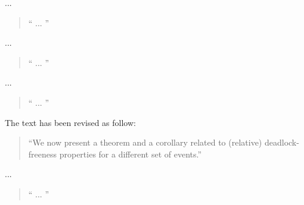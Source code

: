 \documentclass{response}
\begin{document}
\begin{comment}{Reviewer \#1}
• p.15 Fig. 5 is too small. One cannot read its text.
\end{comment}

\begin{response}
  ...
  \begin{quote}
    `` ...
   ''
  \end{quote}
\end{response}

\begin{comment}{Reviewer \#1}
• p.18 It would have been interesting to state the discussion of the first
paragraph of section 7: Verification of Safety Properties within the
context of the proof obligation generator you have at hand.
\end{comment}

\begin{response}
  ...
  \begin{quote}
    `` ...
   ''
  \end{quote}
\end{response}

\begin{comment}{Reviewer \#1}
• p.19 Could you precise your notion of run.
\end{comment}

\begin{response}
  ...
  \begin{quote}
    `` ...
   ''
  \end{quote}
\end{response}


\begin{comment}{Reviewer \#1}
• p. 20 typo. We are now present
\end{comment}

\begin{response}
  The text has been revised as follow:
  \begin{quote}
    ``We now present a theorem and a corollary related to (relative)
    deadlock-freeness properties for a different set of events.''
  \end{quote}
\end{response}

\begin{comment}{Reviewer \#1}
• p. 21 Could you give a formal definition or at least a reference of your 
strong fairness.
\end{comment}

\begin{response}
  ...
  \begin{quote}
    `` ...
   ''
  \end{quote}
\end{response}
\end{document}

